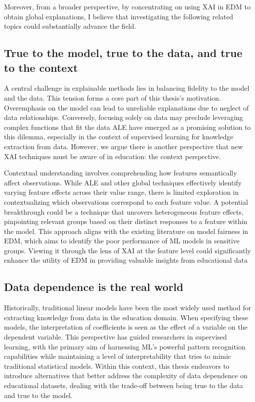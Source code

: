 Moreover, from a broader perspective, by concentrating on using XAI in EDM to obtain global explanations, I believe that investigating the following related topics could substantially advance the field. 

\subsection{True to the model, true to the data, and true to the context}

A central challenge in explainable methods lies in balancing fidelity to the model and the data. This tension forms a core part of this thesis's motivation. Overemphasis on the model can lead to unreliable explanations due to neglect of data relationships. Conversely, focusing solely on data may preclude leveraging complex functions that fit the data ALE have emerged as a promising solution to this dilemma, especially in the context of supervised learning for knowledge extraction from data. However, we argue there is another perspective that new XAI techniques must be aware of in education: the context perspective.

Contextual understanding involves comprehending how features semantically affect observations. While ALE and other global techniques effectively identify varying feature effects across their value range, there is limited exploration in contextualizing which observations correspond to each feature value. A potential breakthrough could be a technique that uncovers heterogeneous feature effects, pinpointing relevant groups based on their distinct responses to a feature within the model. This approach aligns with the existing literature on model fairness in EDM, which aims to identify the poor performance of ML models in sensitive groups. Viewing it through the lens of XAI at the feature level could significantly enhance the utility of EDM in providing valuable insights from educational data

\subsection{Data dependence is the real world}

Historically, traditional linear models have been the most widely used method for extracting knowledge from data in the education domain. When specifying these models, the interpretation of coefficients is seen as the effect of a variable on the dependent variable. This perspective has guided researchers in supervised learning, with the primary aim of harnessing ML's powerful pattern recognition capabilities while maintaining a level of interpretability that tries to mimic traditional statistical models. Within this context, this thesis endeavors to introduce alternatives that better address the complexity of data dependence on educational datasets, dealing with the trade-off between being true to the data and true to the model.

